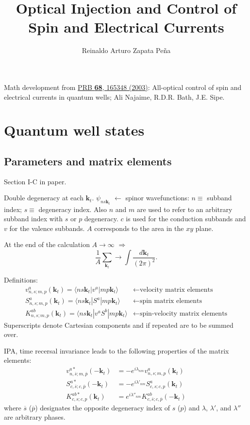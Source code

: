 \documentclass{article}
\title{Optical Injection and Control of Spin and Electrical Currents}
\author{Reinaldo Arturo Zapata Pe\~na}
\date{}
\newcommand{\kt}{\mathbf{k}_{t}}
\begin{document}
\maketitle

Math development from
\href{http://journals.aps.org/prb/abstract/10.1103/PhysRevB.68.165348}{PRB
\textbf{68}, 165348 (2003)}: All-optical control of spin and electrical currents
in quantum wells; Ali Najaime, R.D.R. Bath, J.E. Sipe.


\section{Quantum well states} %
\label{sec:quantum_well_states}

\subsection{Parameters and matrix elements}
{\small Section I-C in paper. \\}

Double degeneracy at each $\kt$. $\psi_{ns\kt}$ $\leftarrow$ spinor
wavefunctions: $n \equiv$ subband index; $s\equiv$ degeneracy index. Also $n$
and $m$ are used to refer to an arbitrary subband index with $s$ or $p$
degeneracy. $c$ is used for the conduction subbands and $v$ for the valence
subbands. $A$ corresponds to the area in the $xy$ plane.

At the end of the calculation $A \rightarrow \infty$ $\Rightarrow$
\begin{equation*}
\frac{1}{A} \sum_{\kt} \rightarrow \int \frac{d\kt}{(2 \pi)^{2}} .
\end{equation*}

Definitions:
\begin{align*}
v_{n,s;m,p}^{a}(\kt) = \langle ns\kt | v^{a} |
mp\kt \rangle & \leftarrow \text{velocity matrix elements}\\
S_{n,s;m,p}^{a}(\kt) = \langle ns\kt | S^{a} |
mp\kt \rangle & \leftarrow \text{spin matrix elements}\\
K_{n,s;m,p}^{ab}(\kt)= \langle ns\kt | v^{a}S^{b} |
mp\kt \rangle & \leftarrow \text{spin-velocity matrix elements}
\end{align*}
Superscripts denote Cartesian components and if repeated are to be summed over.

IPA, time recersal invariance leads to the following properties of the matrix
elements:
\begin{align*}
v_{n,\overline{s};m,\overline{p}}^{a*}(-\kt) &=
 -e^{i \lambda_{nm}} v_{n,s;m,p}^{a}(\kt)\\
S_{c,\overline{s};c,\overline{p}}^{a*}(-\kt) &=
 -e^{i \lambda'_{nm}} S_{c,s;c,p}^{a}(\kt)\\
K_{c,s;c,p}^{ab*}(\kt)&= 
 e^{i \lambda''_{nm}} K_{c,\overline{s};c,\overline{p}}^{ab}(-\kt)
\end{align*}
where $\overline{s}$ ($\overline{p}$) designates the opposite degeneracy index
of $s$ ($p$) and $\lambda$, $\lambda'$, and $\lambda''$ are arbitrary phases.
\end{document}
